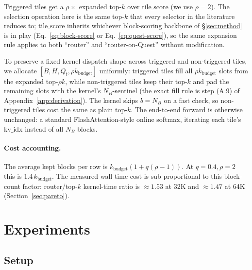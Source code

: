 \documentclass[11pt]{article}
\theoremstyle{remark}
\newcommand{\kbudget}{k_{\text{budget}}}
\newcommand{\NB}{N_{\!B}}
\begin{document}
Triggered tiles get a $\rho\times$ expanded top-$k$ over $\text{tile\_score}$ (we use $\rho = 2$). The selection operation here is the same top-$k$ that every selector in the literature reduces to; $\text{tile\_score}$ inherits whichever block-scoring backbone of §\ref{sec:method} is in play (Eq.~\eqref{eq:block-score} or Eq.~\eqref{eq:quest-score}), so the same expansion rule applies to both ``router'' and ``router-on-Quest'' without modification.

To preserve a fixed kernel dispatch shape across triggered and non-triggered tiles, we allocate $[B, H, Q_t, \rho\kbudget]$ uniformly: triggered tiles fill all $\rho\kbudget$ slots from the expanded top-$\rho k$, while non-triggered tiles keep their top-$k$ and pad the remaining slots with the kernel's $\NB$-sentinel (the exact fill rule is step (A.9) of Appendix~\ref{app:derivation}). The kernel skips $b=\NB$ on a fast check, so non-triggered tiles cost the same as plain top-$k$. The end-to-end forward is otherwise unchanged: a standard FlashAttention-style online softmax, iterating each tile's $\text{kv\_idx}$ instead of all $\NB$ blocks.

\paragraph{Cost accounting.} The average kept blocks per row is $\kbudget(1 + q(\rho - 1))$. At $q = 0.4, \rho = 2$ this is $1.4\,\kbudget$. The measured wall-time cost is sub-proportional to this block-count factor: router/top-$k$ kernel-time ratio is $\approx 1.53$ at 32K and $\approx 1.47$ at 64K (Section~\ref{sec:pareto}).

\section{Experiments}\label{sec:experiments}

\subsection{Setup}
\end{document}
